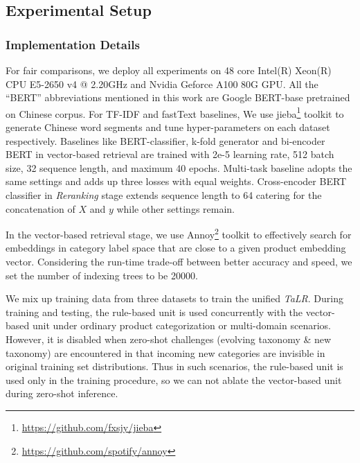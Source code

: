 \subsection{Experimental Setup}
\subsubsection{Implementation Details}
\label{sec:exp detail}
For fair comparisons, we deploy all experiments on 48 core Intel(R) Xeon(R) CPU E5-2650 v4 @ 2.20GHz and Nvidia Geforce A100 80G GPU.
All the ``BERT'' abbreviations mentioned in this work are Google BERT-base pretrained on Chinese corpus. 
For TF-IDF and fastText baselines, We use jieba\footnote{\href{https://github.com/fxsjy/jieba}{https://github.com/fxsjy/jieba}} toolkit to generate Chinese word segments and tune hyper-parameters on each dataset respectively. 
Baselines like BERT-classifier, k-fold generator and bi-encoder BERT in vector-based retrieval are trained with 2e-5 learning rate, 512 batch size, 32 sequence length, and maximum 40 epochs.
Multi-task baseline adopts the same settings and adds up three losses with equal weights. Cross-encoder BERT classifier in \textit{Reranking} stage extends sequence length to 64 catering for the concatenation of $X$ and $y$ while other settings remain. 

In the vector-based retrieval stage, we use Annoy\footnote{\href{https://github.com/spotify/annoy}{https://github.com/spotify/annoy}} toolkit to effectively search for embeddings in category label space that are close to a given product embedding vector. Considering the run-time trade-off between better accuracy and speed, we set the number of indexing trees to be 20000.

We mix up training data from three datasets to train the unified \textit{TaLR}. 
During training and testing, the rule-based unit is used concurrently with the vector-based unit under ordinary product categorization or multi-domain scenarios. However, it is disabled when zero-shot challenges (evolving taxonomy  \& new taxonomy) are encountered in that incoming new categories are invisible in original training set distributions. Thus in such scenarios, the rule-based unit is used only in the training procedure, so we can not ablate the vector-based unit during zero-shot inference.
